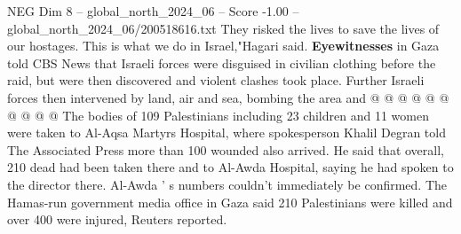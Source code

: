 \begin{textsample}{NEG Dim 8 – global\_north\_2024\_06 – Score -1.00 – global\_north\_2024\_06/200518616.txt}
They risked the lives to save the lives of our hostages.
This is what we do in Israel,"Hagari said. \textbf{Eyewitnesses} in Gaza told CBS News that Israeli forces were disguised in civilian clothing before the raid, but were then discovered and violent clashes took place.
Further Israeli forces then intervened by land, air and sea, bombing the area and @ @ @ @ @ @ @ @ @ @ The bodies of 109 Palestinians including 23 children and 11 women were taken to Al-Aqsa Martyrs Hospital, where spokesperson Khalil Degran told The Associated Press more than 100 wounded also arrived.
He said that overall, 210 dead had been taken there and to Al-Awda Hospital, saying he had spoken to the director there.
Al-Awda ' s numbers couldn't immediately be confirmed.
The Hamas-run government media office in Gaza said 210 Palestinians were killed and over 400 were injured, Reuters reported.

\end{textsample}
